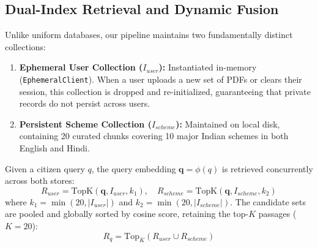 \documentclass[conference]{IEEEtran}
\begin{document}
\subsection{Dual-Index Retrieval and Dynamic Fusion}
Unlike uniform databases, our pipeline maintains two fundamentally distinct collections:
\begin{enumerate}
    \item \textbf{Ephemeral User Collection ($I_{user}$):} Instantiated in-memory (\texttt{EphemeralClient}). When a user uploads a new set of PDFs or clears their session, this collection is dropped and re-initialized, guaranteeing that private records do not persist across users.
    \item \textbf{Persistent Scheme Collection ($I_{scheme}$):} Maintained on local disk, containing 20 curated chunks covering 10 major Indian schemes in both English and Hindi.
\end{enumerate}

Given a citizen query $q$, the query embedding $\mathbf{q} = \phi(q)$ is retrieved concurrently across both stores:
\begin{equation}
R_{user} = \mathrm{TopK}(\mathbf{q}, I_{user}, k_1), \quad R_{scheme} = \mathrm{TopK}(\mathbf{q}, I_{scheme}, k_2)
\end{equation}
where $k_1 = \min(20, |I_{user}|)$ and $k_2 = \min(20, |I_{scheme}|)$. The candidate sets are pooled and globally sorted by cosine score, retaining the top-$K$ passages ($K=20$):
\begin{equation}
R_q = \mathrm{Top}_{K}(R_{user} \cup R_{scheme})
\end{equation}
\end{document}
